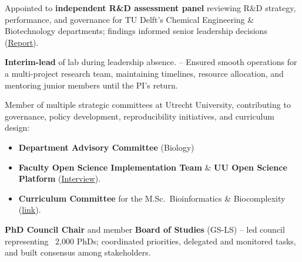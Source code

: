 \documentclass[a4paper,10pt]{article}
\begin{document}
{\begin{adjustbox}{valign=t}
\begin{minipage}[t]{0.6\textwidth}

\begin{description}
\raggedright
\item[\normalfont \textcolor{ForestGreen}{\textbf{2021 -- 2022.}}] Appointed to \textbf{independent R\&D assessment panel} reviewing R\&D strategy, performance, and governance 
  for TU Delft’s Chemical Engineering \& Biotechnology departments; findings informed senior leadership decisions 
  (\href{https://filelist.tudelft.nl/TUDelft/Onderzoek/Kwaliteitsborging/Final report SEP Chemistry TU Delft 20220204.pdf}{Report}).
\item[\normalfont \textcolor{ForestGreen}{\textbf{2019.}}] \textbf{Interim-lead} of lab during leadership absence. -- 
  Ensured smooth operations for a multi-project research team, maintaining timelines, resource allocation, and mentoring junior members until the PI’s return.
\item[\normalfont \textcolor{ForestGreen}{\textbf{2019 -- now.}}] Member of multiple strategic committees at Utrecht University, 
contributing to governance, policy development, reproducibility initiatives, and curriculum design:
  \begin{itemize}
    \item \textbf{Department Advisory Committee} (Biology) %
    \item \textbf{Faculty Open Science Implementation Team} \& \textbf{UU Open Science Platform} %
      (\href{https://www.uu.nl/en/news/meet-laura-dijkhuizen}{Interview}).
    \item \textbf{Curriculum Committee} for the M.Sc.\ Bioinformatics \& Biocomplexity %
    (\href{https://www.uu.nl/en/masters/bioinformatics-and-biocomplexity}{link}).
  \end{itemize}
  \item[\normalfont \textcolor{ForestGreen}{\textbf{2017 -- 2021.}}] \textbf{PhD Council Chair} 
    and member \textbf{Board of Studies} (GS-LS) 
      -- led council representing ~2,000 PhDs; coordinated priorities, delegated and monitored tasks, 
      and built consensus among stakeholders.
\end{description}



\end{minipage}
\end{adjustbox}}
\end{document}
